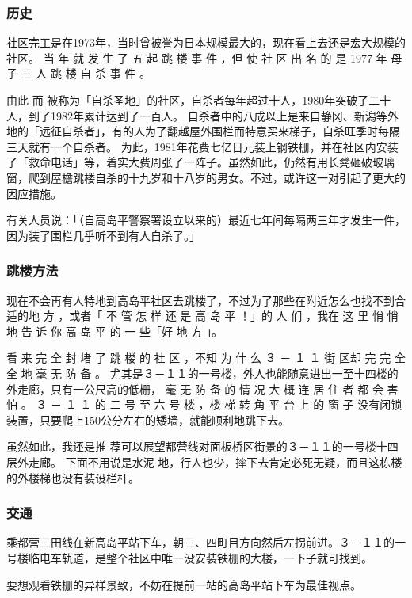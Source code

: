 \documentclass[UTF8]{ctexart}
\begin{document}
\subsubsection{历史}

社区完工是在1973年，当时曾被誉为日本规模最大的，现在看上去还是宏大规模的社区。 
当 年 就 发 生 了 五 起 跳 楼 事 件 ，但 使 社 区 出 名 的 是 1977 年 母 子 三 人 跳 楼 自 杀 事 件 。

由此 而 被称为「自杀圣地」的社区，自杀者每年超过十人，1980年突破了二十人，到了1982年累计达到了一百人。 
自杀者中的八成以上是来自静冈、新潟等外地的「远征自杀者」，有的人为了翻越屋外围栏而特意买来梯子，自杀旺季时每隔三天就有一个自杀者。
为此，1981年花费七亿日元装上钢铁栅，并在社区内安装了「救命电话」等，着实大费周张了一阵子。虽然如此，仍然有用长凳砸破玻璃窗，爬到屋檐跳楼自杀的十九岁和十八岁的男女。不过，或许这一对引起了更大的因应措施。

有关人员说：「（自高岛平警察署设立以来的）最近七年间每隔两三年才发生一件，因为装了围栏几乎听不到有人自杀了。」

\subsubsection{跳楼方法}

现在不会再有人特地到高岛平社区去跳楼了，不过为了那些在附近怎么也找不到合适的地
方 ，或者「 不 管 怎 样 还 是 高 岛 平 ！」的 人 们 ，我在 这 里 悄 悄 地 告 诉 你 高 岛 平 的 一 些「好 地 方 」。

看 来 完 全 封 堵 了 跳 楼 的 社 区 ，不知 为 什 么 ３ － １ １ 街 区却 完 完 全 全 地 毫 无 防 备 。 
尤其是３－１１的一号楼，外人也能随意进出一至十四楼的外走廊，只有一公尺高的低栅， 毫 无 防 备 的 情 况 大 概 连 居 住 者 都 会 害 怕 。
３ － １ １ 的 二 号  至  六 号 楼 ，楼 梯 转 角 平 台 上 的 窗 子 没有闭锁装置，只要爬上$150$公分左右的矮墙，就能顺利地跳下去。

虽然如此，我还是推 荐可以展望都营线对面板桥区街景的３－１１的一号楼十四层外走廊。
下面不用说是水泥 地，行人也少，摔下去肯定必死无疑，而且这栋楼的外楼梯也没有装设栏杆。

\subsubsection{交通}

乘都营三田线在新高岛平站下车，朝三、四町目方向然后左拐前进。３－１１的一号楼临电车轨道，是整个社区中唯一没安装铁栅的大楼，一下子就可找到。

要想观看铁栅的异样景致，不妨在提前一站的高岛平站下车为最佳视点。
\end{document}
